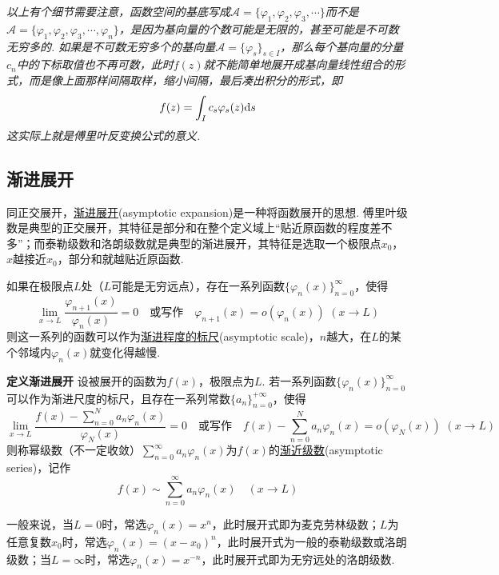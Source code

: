 \documentclass[UTF8]{ctexart}
\newcommand{\trm}[1]{{\rm #1}}
\newenvironment{definition}[1]
    {\begin{tcolorbox}[enhanced, colback=LightYellow, breakable=false, frame hidden, borderline west={1.5mm}{-2mm}{DarkGreen}]
    {\bfseries {\color{DarkGreen} 定义}\quad #1} \newline}
    {\end{tcolorbox}}
\begin{document}
\textit{
    以上有个细节需要注意，函数空间的基底写成\(\mathcal{A}=\{\varphi_1,\varphi_2,\varphi_3,\cdots\}\)而不是\(\mathcal{A}=\{\varphi_1,\varphi_2,\varphi_3,\cdots,\varphi_n\}\)，是因为基向量的个数可能是无限的，甚至可能是不可数无穷多的. 如果是不可数无穷多个的基向量\(\mathcal{A}=\{\varphi_s\}_{s \in I}\)，那么每个基向量的分量\(c_n\)中的下标取值也不再可数，此时\(f(z)\)就不能简单地展开成基向量线性组合的形式，而是像上面那样间隔取样，缩小间隔，最后凑出积分的形式，即
    \[f(z)=\int_{I}c_s\varphi_s(z)\trm{d}s\]
    这实际上就是傅里叶反变换公式的意义.
}


\subsection{渐进展开}

同正交展开，\uline{渐进展开}(asymptotic expansion)是一种将函数展开的思想. 傅里叶级数是典型的正交展开，其特征是部分和在整个定义域上“贴近原函数的程度差不多”；而泰勒级数和洛朗级数就是典型的渐进展开，其特征是选取一个极限点\(x_0\)，\(x\)越接近\(x_0\)，部分和就越贴近原函数. 

如果在极限点\(L\)处（\(L\)可能是无穷远点），存在一系列函数\(\{\varphi_n(x)\}_{n=0}^{\infty}\)，使得
\[\lim_{x \to L} \frac{\varphi_{n+1}(x)}{\varphi_n(x)} = 0 \quad \mbox{或写作} \quad \varphi_{n+1}(x)=o(\varphi_n(x)) \,\, (x \to L)\]
则这一系列的函数可以作为\uline{渐进程度的标尺}(asymptotic scale)，\(n\)越大，在\(L\)的某个邻域内\(\varphi_n(x)\)就变化得越慢. 

\begin{definition}{渐进展开}
    设被展开的函数为\(f(x)\)，极限点为\(L\). 若一系列函数\(\{\varphi_n(x)\}_{n=0}^{\infty}\)可以作为渐进尺度的标尺，且存在一系列常数\(\{a_n\}_{n=0}^{+\infty}\)，使得
    \[\lim_{x \to L} \frac{f(x) - \displaystyle{\sum_{n=0}^{N}a_n\varphi_n(x)}}{\varphi_N(x)} = 0 \quad \mbox{或写作} \quad f(x) - \sum_{n=0}^{N}a_n\varphi_n(x) = o(\varphi_N(x)) \,\, (x \to L)\]
    则称幂级数（不一定收敛）\(\displaystyle{\sum_{n=0}^{\infty}a_n\varphi_n(x)}\)为\(f(x)\)的\uline{渐近级数}(asymptotic series)，记作
    \[f(x) \sim \sum_{n=0}^{\infty}a_n\varphi_n(x) \quad (x \to L)\]
\end{definition}

一般来说，当\(L=0\)时，常选\(\varphi_n(x)=x^n\)，此时展开式即为麦克劳林级数；\(L\)为任意复数\(x_0\)时，常选\(\varphi_n(x) = (x-x_0)^n\)，此时展开式为一般的泰勒级数或洛朗级数；当\(L=\infty\)时，常选\(\varphi_n(x)=x^{-n}\)，此时展开式即为无穷远处的洛朗级数.
\end{document}
